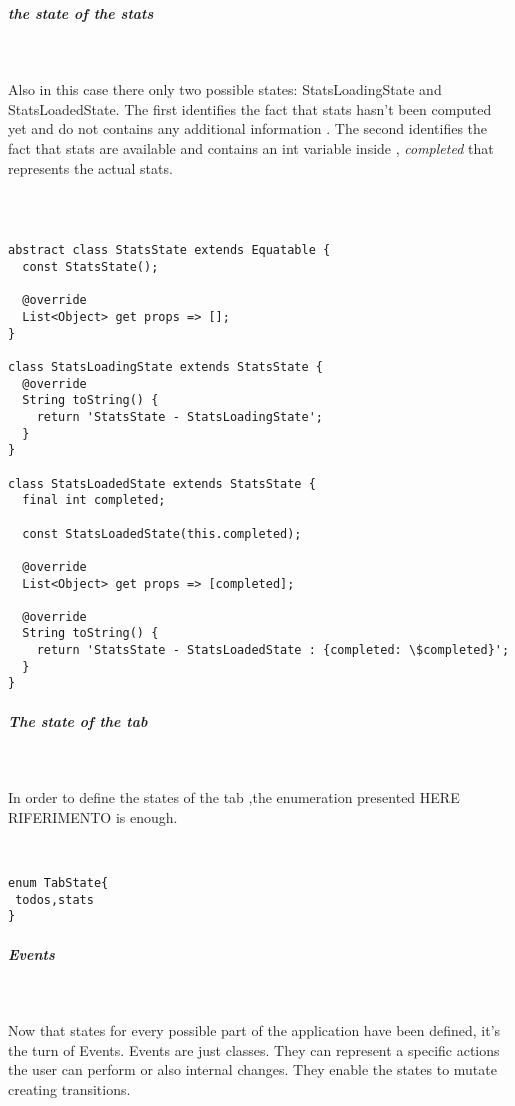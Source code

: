 \subparagraph{the state of the stats }\mbox{}\\
\label{subpar:todo_app_bloc_core_state}

Also in this case there only two possible states:  StatsLoadingState and StatsLoadedState. The first identifies the fact that stats hasn’t been computed yet and do not contains any additional information . The second identifies the fact that stats are available and contains an int variable inside ,  \textit{completed} that represents the actual stats.
\begin{code}
\mbox{}\\
 \mbox{}
\label{code:2.14}
\begin{verbatim}

abstract class StatsState extends Equatable {
  const StatsState();

  @override
  List<Object> get props => [];
}

class StatsLoadingState extends StatsState {
  @override
  String toString() {
    return 'StatsState - StatsLoadingState';
  }
}

class StatsLoadedState extends StatsState {
  final int completed;

  const StatsLoadedState(this.completed);

  @override
  List<Object> get props => [completed];

  @override
  String toString() {
    return 'StatsState - StatsLoadedState : {completed: \$completed}';
  }
}
\end{verbatim}
\mbox{}
\end{code}


\subparagraph{The state of the tab}\mbox{}\\
\label{subpar:todo_app_bloc_core_state}

In order to define the states of the tab ,the enumeration presented HERE RIFERIMENTO is enough.
\begin{code}
\mbox{}\\
 \mbox{}
\label{code:2.14}
\begin{verbatim}
enum TabState{
 todos,stats
}
\end{verbatim}
\mbox{}
\end{code}


\subparagraph{Events}\mbox{}\\
\label{subpar:todo_app_bloc_core_state}

Now that states for every possible part of the application have been defined, it’s the turn of Events. Events are just classes. They can represent a specific actions the user can perform or also internal changes. They enable the states to mutate creating transitions. 


